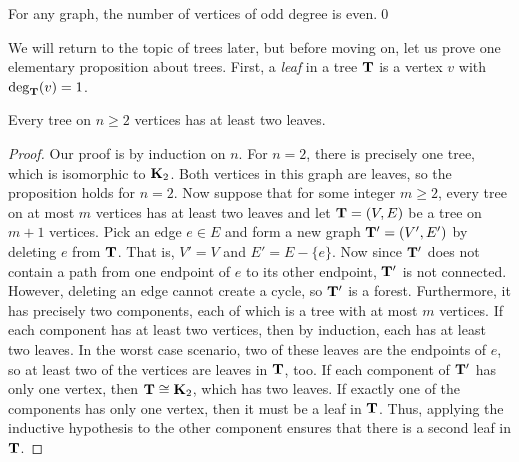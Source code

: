 \begin{corollary}
  For any graph, the number of vertices of odd degree is even.\qed
\end{corollary}

We will return to the topic of trees later, but before moving on, let
us prove one elementary proposition about trees. First, a
\textit{leaf} in a tree $\mathbf{T}$ is a vertex $v$ with $\deg_{\mathbf{T}}(v)=1$.

\begin{proposition}\label{prop:tree-leaves}
  Every tree on $n\geq 2$ vertices has at least two leaves.
\end{proposition}

\begin{proof}
  Our proof is by induction on $n$. For $n=2$, there is precisely one
  tree, which is isomorphic to $\mathbf{K}_2$. Both vertices in this graph
  are leaves, so the proposition holds for $n=2$. Now suppose that for
  some integer $m\geq 2$, every tree on at most $m$ vertices has at
  least two leaves and let $\mathbf{T}=(V,E)$ be a tree on $m+1$ vertices.
  Pick an edge $e\in E$ and form a new graph $\mathbf{T}'=(V',E')$ by
  deleting $e$ from $\mathbf{T}$. That is, $V'=V$ and $E'=E-\{e\}$. Now
  since $\mathbf{T}'$ does not contain a path from one endpoint of $e$ to
  its other endpoint, $\mathbf{T}'$ is not connected. However, deleting an
  edge cannot create a cycle, so $\mathbf{T}'$ is a forest. Furthermore, it
  has precisely two components, each of which is a tree with at most
  $m$ vertices. If each component has at least two vertices, then by
  induction, each has at least two leaves. In the worst case scenario,
  two of these leaves are the endpoints of $e$, so at least two of the
  vertices are leaves in $\mathbf{T}$, too. If each component of $\mathbf{T}'$ has
  only one vertex, then $\mathbf{T}\cong \mathbf{K}_2$, which has two leaves. If
  exactly one of the components has only one vertex, then it must be a
  leaf in $\mathbf{T}$. Thus, applying the inductive hypothesis to the other
  component ensures that there is a second leaf in $\mathbf{T}$.
\end{proof}

